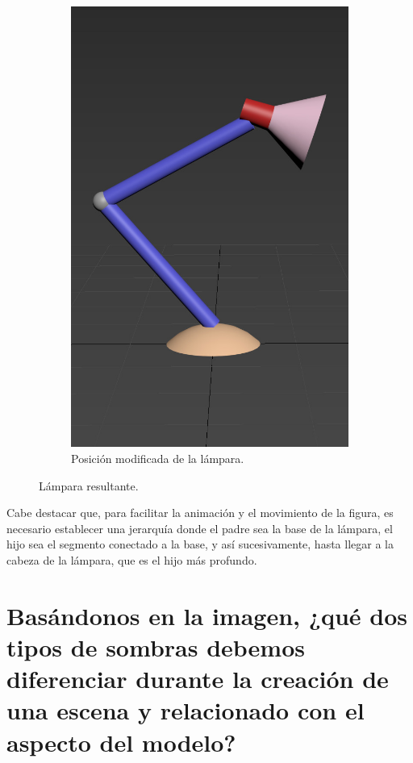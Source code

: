\documentclass{article}
\begin{document}
\begin{figure}[H]
\begin{subfigure}[H]{0.38\textwidth}
\includegraphics[width=\textwidth]{imagenes/lamp2.jpg}
\caption{Posición modificada de la lámpara.}
     \end{subfigure}    
    \caption{Lámpara resultante.}
 \end{figure}

Cabe destacar que, para facilitar la animación y el movimiento de la figura, es necesario establecer una jerarquía donde el padre sea la base de la lámpara, el hijo sea el segmento conectado a la base, y así sucesivamente, hasta llegar a la cabeza de la lámpara, que es el hijo más profundo.

\section{Basándonos en la imagen, ¿qué dos tipos de sombras debemos diferenciar durante la creación de una escena y relacionado con el aspecto del modelo?}
\end{document}
